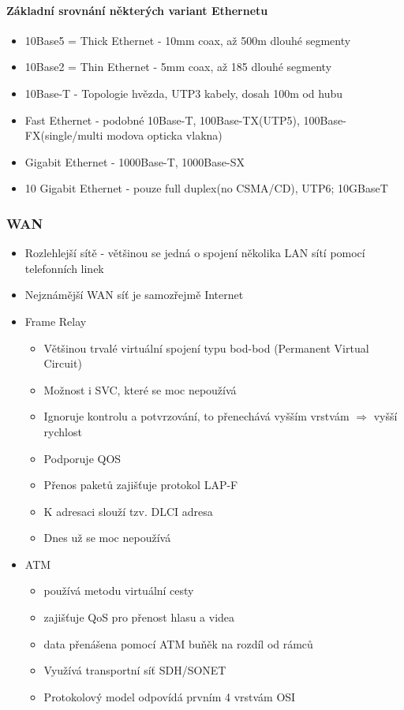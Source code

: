 \documentclass[10pt,a4paper]{article}
\begin{document}
\paragraph{Základní srovnání některých variant Ethernetu}
\begin{itemize}
\item 10Base5 = Thick Ethernet - 10mm coax, až 500m dlouhé segmenty
\item 10Base2 = Thin Ethernet - 5mm coax, až 185 dlouhé segmenty
\item 10Base-T - Topologie hvězda, UTP3 kabely, dosah 100m od hubu
\item Fast Ethernet - podobné 10Base-T, 100Base-TX(UTP5), 100Base-FX(single/multi modova opticka vlakna)
\item Gigabit Ethernet - 1000Base-T, 1000Base-SX
\item 10 Gigabit Ethernet - pouze full duplex(no CSMA/CD), UTP6; 10GBaseT
\end{itemize}

\subsubsection{WAN}

\begin{itemize}
\item Rozlehlejší sítě - většinou se jedná o spojení několika LAN sítí pomocí telefonních linek
\item Nejznámější WAN síť je samozřejmě Internet
\item Frame Relay

\begin{itemize}
\item Většinou trvalé virtuální spojení typu bod-bod (Permanent Virtual Circuit)
\item Možnost i SVC, které se moc nepoužívá
\item Ignoruje kontrolu a potvrzování, to přenechává vyšším vrstvám $\Rightarrow$ vyšší rychlost
\item Podporuje QOS
\item Přenos paketů zajišťuje protokol LAP-F
\item K adresaci slouží tzv. DLCI adresa
\item Dnes už se moc nepoužívá
\end{itemize}
\item ATM
\begin{itemize}
\item používá metodu virtuální cesty
\item zajišťuje QoS pro přenost hlasu a videa
\item data přenášena pomocí ATM buňěk na rozdíl od rámců
\item Využívá transportní síť SDH/SONET
\item Protokolový model odpovídá prvním 4 vrstvám OSI
\end{itemize}
\end{itemize}
\end{document}
